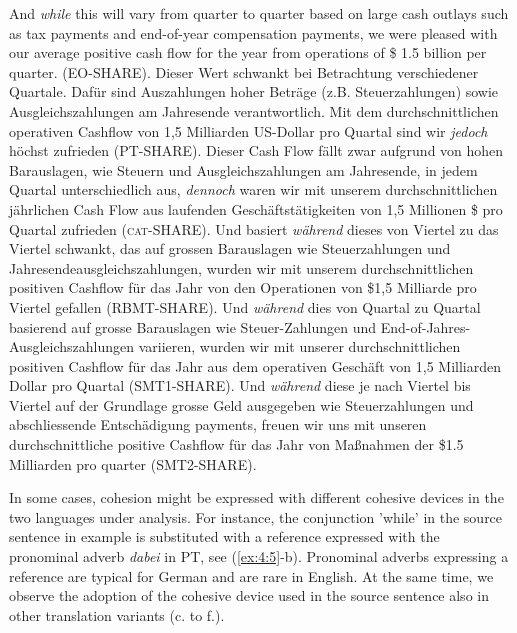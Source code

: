 \documentclass[output=paper]{LSP/langsci}
\begin{document}
\ea \label{ex:4:4}
\ea And \textit{while} this will vary from quarter to quarter based on large cash outlays such as tax payments and end-of-year compensation payments, we were pleased with our average positive cash flow for the year from operations of \$ 1.5 billion per quarter. (EO-SHARE).
\ex Dieser Wert schwankt bei Betrachtung verschiedener Quartale. Dafür sind Auszahlungen hoher Beträge (z.B. Steuerzahlungen) sowie Ausgleichszahlungen am Jahresende verantwortlich. Mit dem durchschnittlichen operativen Cashflow von 1,5 Milliarden US-Dollar pro Quartal sind wir \textit{jedoch} höchst zufrieden (PT-SHARE).
\ex  Dieser Cash Flow fällt zwar aufgrund von hohen Barauslagen, wie Steuern und Ausgleichszahlungen am Jahresende, in jedem Quartal unterschiedlich aus, \textit{dennoch} waren wir mit unserem durchschnittlichen jährlichen Cash Flow aus laufenden Geschäftstätigkeiten von 1,5 Millionen \$ pro Quartal zufrieden (\textsc{cat}-SHARE).
\ex  Und basiert \textit{während} dieses von Viertel zu das Viertel schwankt, das auf grossen Barauslagen wie Steuerzahlungen und Jahresendeausgleichszahlungen, wurden wir mit unserem durchschnittlichen positiven Cashflow für das Jahr von den Operationen von \$1,5 Milliarde pro Viertel gefallen (RBMT-SHARE).
\ex  Und \textit{während} dies von Quartal zu Quartal basierend auf grosse Barauslagen wie Steuer-Zahlungen und End-of-Jahres-Ausgleichszahlungen variieren, wurden wir mit unserer durchschnittlichen positiven Cashflow für das Jahr aus dem operativen Geschäft von 1,5 Milliarden Dollar pro Quartal (SMT1-SHARE).
\ex  Und \textit{während} diese je nach Viertel bis Viertel auf der Grundlage grosse Geld ausgegeben wie Steuerzahlungen und abschliessende Entschädigung payments, freuen wir uns mit unseren durchschnittliche positive Cashflow für das Jahr von Maßnahmen der \$1.5 Milliarden pro quarter (SMT2-SHARE).
\z
\z

In some cases, cohesion might be expressed with different cohesive devices in the two languages under analysis. For instance, the conjunction 'while' in the source sentence in example  is substituted with a reference expressed with the pronominal adverb \textit{dabei} in PT, see (\ref{ex:4:5}-b). Pronominal adverbs expressing a reference are typical for German and are rare in English. At the same time, we observe the adoption of the cohesive device used in the source sentence also in other translation variants (c. to f.).
\end{document}
